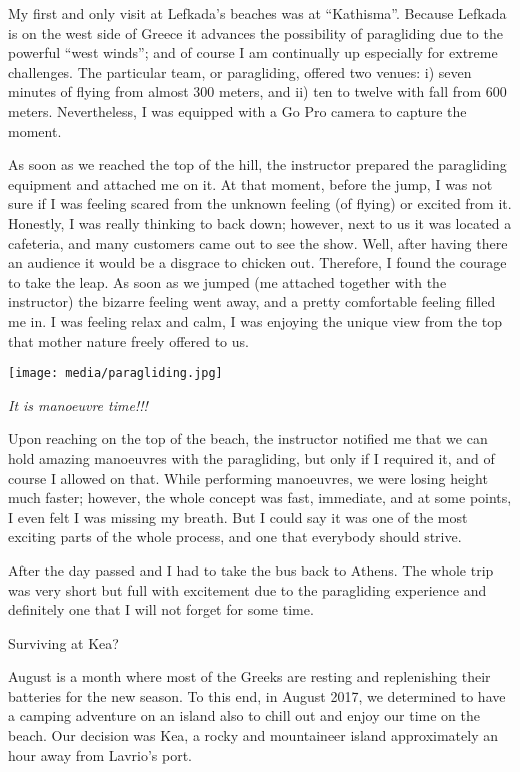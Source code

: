 \documentclass[10pt,a4paper]{article} %
\newcommand{\NewsItem}[1]{ %
\usefont{T1}{fvs}{n}{n} %
\vspace{24pt}\large #1\vspace{3pt} %
\par \normalsize \normalfont}
\begin{document}
\begin{multicols}{3}
My first and only visit at Lefkada's beaches was at ``Kathisma''. 
Because Lefkada is on the west side of Greece it advances the possibility
of paragliding due to the powerful ``west winds'';
and of course I am continually up especially for extreme challenges. 
The particular team, or paragliding, offered two venues:
i) seven minutes of flying from almost 300 meters,
and ii) ten to twelve with fall from 600 meters. 
Nevertheless, I was equipped with a Go Pro camera to capture the moment. 

As soon as we reached the top of the hill,
the instructor prepared the paragliding equipment and attached me on it. 
At that moment, before the jump, I was not sure if I was feeling scared
from the unknown feeling (of flying) or excited from it.
Honestly, I was really thinking to back down;
however, next to us it was located a cafeteria,
and many customers came out to see the show.
Well, after having there an audience it would be a disgrace to chicken out.
Therefore, I found the courage to take the leap.
As soon as we jumped (me attached together with the instructor)
the bizarre feeling went away, and a pretty comfortable feeling filled me in. 
I was feeling relax and calm,
I was enjoying the unique view from the top that mother nature freely offered to us.

\begin{center}
	\texttt{[image: media/paragliding.jpg]}
	\par\textit{It is manoeuvre time!!!}
\end{center}

Upon reaching on the top of the beach, the instructor notified me that
we can hold amazing manoeuvres with the paragliding,
but only if I required it, and of course I allowed on that. 
While performing manoeuvres, we were losing height much faster;
however, the whole concept was fast, immediate, and at some points,
I even felt I was missing my breath. 
But I could say it was one of the most exciting parts of the whole process,
and one that everybody should strive.

After the day passed and I had to take the bus back to Athens. 
The whole trip was very short but full with excitement
due to the paragliding experience and definitely one that
I will not forget for some time.

\NewsItem{Surviving at Kea?}
August is a month where most of the Greeks are resting
and replenishing their batteries for the new season. 
To this end, in August 2017,
we determined to have a camping adventure on an island
also to chill out and enjoy our time on the beach. 
Our decision was Kea, a rocky and mountaineer island
approximately an hour away from Lavrio's port.


\end{multicols}
\end{document}
